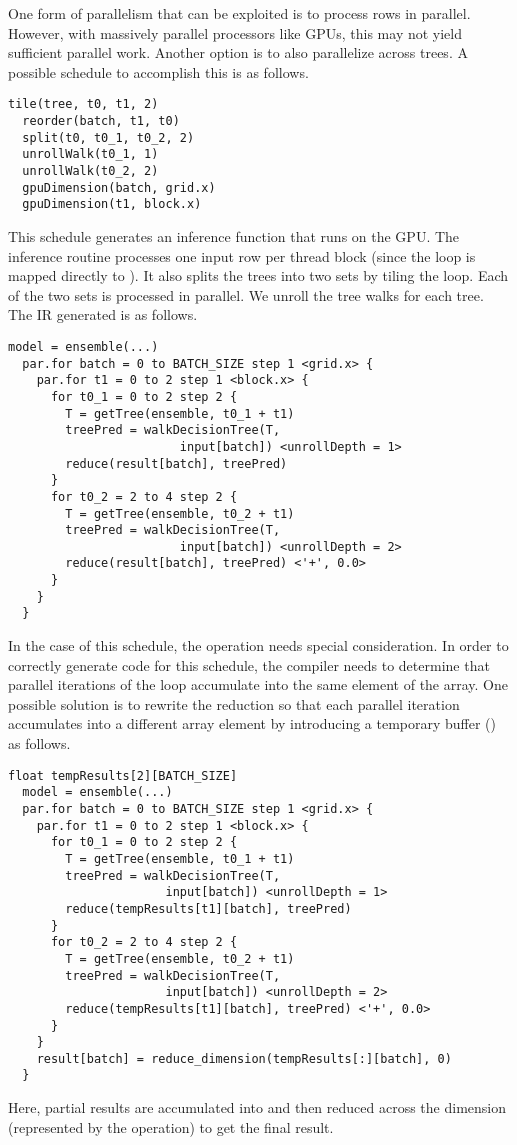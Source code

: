One form of parallelism that can be exploited is to process rows in 
parallel. However, with massively parallel processors like GPUs,
this may not yield sufficient parallel work. Another option is to also 
parallelize across trees. A possible schedule to accomplish this is as follows.
\begin{lstlisting}[style=c++]
  tile(tree, t0, t1, 2)
  reorder(batch, t1, t0)
  split(t0, t0_1, t0_2, 2)
  unrollWalk(t0_1, 1)
  unrollWalk(t0_2, 2)
  gpuDimension(batch, grid.x)
  gpuDimension(t1, block.x)
\end{lstlisting}
This schedule generates an inference function that runs on the GPU. 
The inference routine processes one input row per thread block (since the 
loop is mapped directly to ).
It also splits the trees into two sets by tiling the  loop.
Each of the two sets is processed in parallel. We unroll the tree walks 
for each tree. The IR generated is as follows. 
\begin{lstlisting}[style=c++]
  model = ensemble(...)
  par.for batch = 0 to BATCH_SIZE step 1 <grid.x> {
    par.for t1 = 0 to 2 step 1 <block.x> {
      for t0_1 = 0 to 2 step 2 {
        T = getTree(ensemble, t0_1 + t1)
        treePred = walkDecisionTree(T, 
                        input[batch]) <unrollDepth = 1>
        reduce(result[batch], treePred)
      }
      for t0_2 = 2 to 4 step 2 {
        T = getTree(ensemble, t0_2 + t1)
        treePred = walkDecisionTree(T,
                        input[batch]) <unrollDepth = 2>
        reduce(result[batch], treePred) <'+', 0.0>
      }
    }
  }
\end{lstlisting}

In the case of this schedule, the 
operation needs special consideration. In order to correctly generate 
code for this schedule, the compiler needs to determine that parallel 
iterations of the  
loop accumulate into the same element of the  array.
One possible solution is to rewrite the reduction so that each parallel 
iteration accumulates into a different array element by introducing 
a temporary buffer () as follows.
\begin{lstlisting}[style=c++]
  float tempResults[2][BATCH_SIZE]
  model = ensemble(...)
  par.for batch = 0 to BATCH_SIZE step 1 <grid.x> {
    par.for t1 = 0 to 2 step 1 <block.x> {
      for t0_1 = 0 to 2 step 2 {
        T = getTree(ensemble, t0_1 + t1)
        treePred = walkDecisionTree(T, 
                      input[batch]) <unrollDepth = 1>
        reduce(tempResults[t1][batch], treePred)
      }
      for t0_2 = 2 to 4 step 2 {
        T = getTree(ensemble, t0_2 + t1)
        treePred = walkDecisionTree(T,
                      input[batch]) <unrollDepth = 2>
        reduce(tempResults[t1][batch], treePred) <'+', 0.0>
      }
    }
    result[batch] = reduce_dimension(tempResults[:][batch], 0)
  }
\end{lstlisting}
Here, partial results are accumulated into  and then
reduced across the  dimension (represented by the 
operation) to get the final result.


